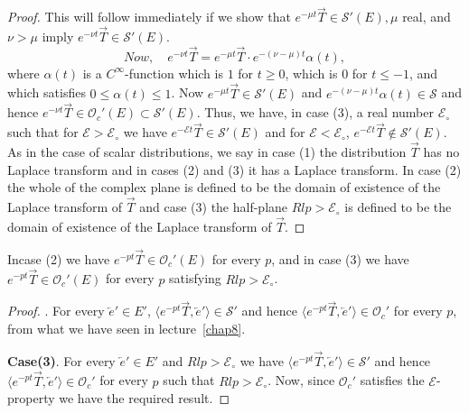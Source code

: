 \begin{proof}
This will follow immediately if we show that $e^{-\mu
t}\overrightarrow{T} \in \mathscr{S}'(E), \mu$ real, and $\nu > \mu$
imply $e^{-\nu t} \overrightarrow{T} \in \mathscr{S}'(E)$.
$$
Now,\quad e^{-\nu t} \overrightarrow{T} = e^{-\mu
t}\overrightarrow{T} \cdot e^{-(\nu -\mu)t} \alpha (t),
$$
where $\alpha (t)$ is a $C^\infty$-function which is $1$ for $t \geq
0$, which is $0$ for $t\leq -1$, and which satisfies $0\leq\alpha
(t)\leq 1$. Now $e^{-\mu t}\overrightarrow{T} \in \mathscr{S}'(E)$ and
$e^{-(\nu -\mu)t}\alpha (t) \in \mathscr{S}$ and hence $e^{-\nu t}
\overrightarrow{T}\in\mathscr{O}_c' (E) \subset
\mathscr{S}'(E)$. Thus, we have, in case (3), a real number
$\mathscr{E}_\circ$ such that for $\mathscr{E} > \mathscr{E}_\circ$ we
have $e^{-\mathscr{E}t}\overrightarrow{T} \in \mathscr{S}'(E)$ and for
$\mathscr{E} < \mathscr{E}_\circ$, $e^{-\mathscr{E}t}
\overrightarrow{T} \notin \mathscr{S}'(E)$. As in the case of scalar
distributions, we say in case (1) the distribution
$\overrightarrow{T}$ has no Laplace transform and in cases (2) and (3)
it has a Laplace transform. In case (2) the whole of the complex plane
is defined to be the domain of existence of the Laplace transform of
$\overrightarrow{T}$ and case (3) the half-plane $Rl p >
\mathscr{E}_\circ$ is defined to be the domain of existence of the
Laplace transform of $\overrightarrow{T}$.
\end{proof}
\begin{prop}\label{chap9:prop9.2}
In\pageoriginale case (2) we have $e^{-pt}\overrightarrow{T} 
\in \mathscr{O}_c'(E)$ for every $p$, and in case (3) we have 
$e^{-pt} \overrightarrow{T} \in \mathscr{O}_c'(E)$ for every 
$p$ satisfying $Rl p > \mathscr{E}_\circ$. 
\end{prop}
\begin{proof}
. For every $\overleftarrow{e}' \in E'$,
$\langle e^{-pt}\overrightarrow{T},
\overleftarrow{e}'\rangle \in \mathscr{S}'$ and hence $\langle
e^{-pt}\overrightarrow{T}, \overleftarrow{e}'\rangle \in
\mathscr{O}_c'$ for every $p$, from what we have 
seen in lecture~\ref{chap8}.

{\bf Case(3)}. For every $\overleftarrow{e}' \in E'$ and $Rl p>
\mathscr{E}_\circ$ we have $\langle e^{-pt}\overrightarrow{T},
\overleftarrow{e}'\rangle \in \mathscr{S}'$ and hence $\langle e^{-pt}
\overrightarrow{T}, \overleftarrow{e}'\rangle \in \mathscr{O}_c'$ for
every $p$ such that $Rl p > \mathscr{E}_\circ$. Now, since
$\mathscr{O}_c'$ satisfies the $\mathcal{E}$-property we have the
required result. 
\end{proof}

